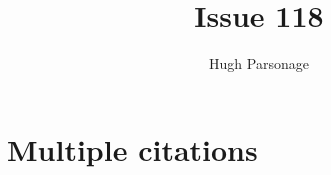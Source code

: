 \documentclass[submission]{grattan}
\title{Issue 118}
\author{Hugh Parsonage}
\begin{document}
\chapter{Multiple citations}\label{chap:multiple-citations}


\textcite{DaleyWoodCoatesEtAl2015}

\textcites{DaleyWoodChivers2017RegPatterns}{Daley-etal-2017-Submission-Natl-housing-finance}{Daley-Coates-2017-Ben-phillips}{DaleyCoates-2017-theAge-Stamp-duty-wont-help-housing-affordability}
\textcites{DaleyCoates-2017-theConvo-Why-old-Aust-wont-downsize}{Daley-Coates-Wiltshire-2017-InsideStory-What-comes-after-housing-boom}{Daley-etal-2017-Submission-NSW-housing-supply-inquiry}


\printbibliography
\end{document}
